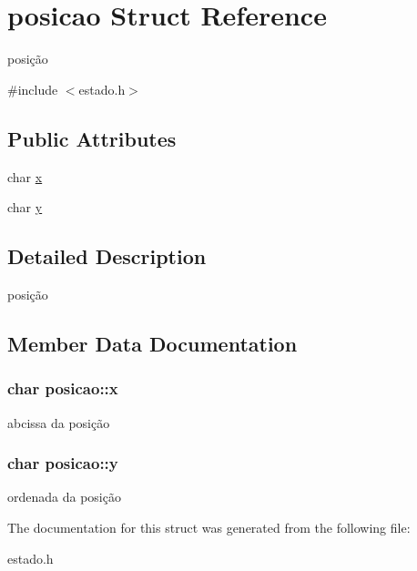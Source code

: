 \hypertarget{structposicao}{}\section{posicao Struct Reference}
\label{structposicao}


posição  




{\ttfamily \#include $<$estado.\+h$>$}

\subsection*{Public Attributes}
\begin{DoxyCompactItemize}
\item 
char \hyperlink{structposicao_abf2dfcd88579d554e31decb47f99e07e}{x}
\item 
char \hyperlink{structposicao_af3ac5b68917a89d8450851e8637231f0}{y}
\end{DoxyCompactItemize}


\subsection{Detailed Description}
posição 

\subsection{Member Data Documentation}
\subsubsection[{\texorpdfstring{x}{x}}]{\setlength{\rightskip}{0pt plus 5cm}char posicao\+::x}\hypertarget{structposicao_abf2dfcd88579d554e31decb47f99e07e}{}\label{structposicao_abf2dfcd88579d554e31decb47f99e07e}
abcissa da posição 
\subsubsection[{\texorpdfstring{y}{y}}]{\setlength{\rightskip}{0pt plus 5cm}char posicao\+::y}\hypertarget{structposicao_af3ac5b68917a89d8450851e8637231f0}{}\label{structposicao_af3ac5b68917a89d8450851e8637231f0}
ordenada da posição 

The documentation for this struct was generated from the following file\+:\begin{DoxyCompactItemize}
\item 
estado.\+h\end{DoxyCompactItemize}
